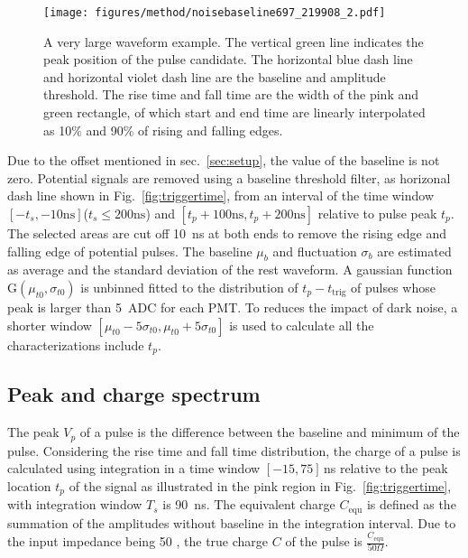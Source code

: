 \begin{figure}[!htbp]
    \centering
    \texttt{[image: figures/method/noisebaseline697\_219908\_2.pdf]}
    \caption{A very large waveform example. The vertical green line indicates the peak position of the pulse candidate. The horizontal blue dash line and horizontal violet dash line are the baseline and amplitude threshold. The rise time and fall time are the width of the pink and green rectangle, of which start and end time are linearly interpolated as 10\% and 90\% of rising and falling edges.}
    \label{fig:baseline1}
\end{figure}

Due to the offset mentioned in sec.~\ref{sec:setup}, the value of the baseline is not zero. Potential signals are removed using a baseline threshold filter, as horizonal dash line shown in Fig.~\ref{fig:triggertime}, from an interval of the time window $[-t_s,-10\mathrm{ns}]$($t_s\leq200\mathrm{ns}$) and $[t_p+100\mathrm{ns},t_p+200\mathrm{ns}]$ relative to pulse peak $t_p$. The selected areas are cut off \SI{10}{ns} at both ends to remove the rising edge and falling edge of potential pulses. The baseline $\mu_b$ and fluctuation $\sigma_b$ are estimated as average and the standard deviation of the rest waveform. A gaussian function G$(\mu_{t0},\sigma_{t0})$ is unbinned fitted to the distribution of $t_p-t_{\mathrm{trig}}$ of pulses whose peak is larger than \SI{5}{ADC} for each PMT. To reduces the impact of dark noise, a shorter window $[\mu_{t0}-5\sigma_{t0}, \mu_{t0}+5\sigma_{t0}]$ is used to calculate all the characterizations include $t_p$.

\subsection{Peak and charge spectrum}
\label{sec:noisepeak}

The peak $V_p$ of a pulse is the difference between the baseline and minimum of the pulse. Considering the rise time and fall time distribution, the charge of a pulse is calculated using integration in a time window $[-15, 75]$\,ns relative to the peak location $t_p$ of the signal as illustrated in the pink region in Fig.~\ref{fig:triggertime}, with integration window $T_s$ is \SI{90}{ns}. The equivalent charge $C_{\mathrm{equ}}$ is defined as the summation of the amplitudes without baseline in the integration interval. Due to the input impedance being \SI{50}{\Omega} \cite{CAENV1751}, the true charge $C$ of the pulse is $\frac{C_{\mathrm{equ}}}{50 \Omega}$.

